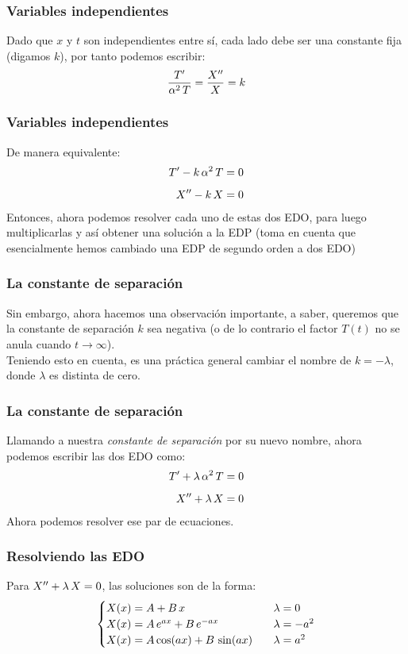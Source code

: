 \documentclass[12pt]{beamer}
\begin{document}
\begin{frame}
\frametitle{Variables independientes}
Dado que $x$ y $t$ son independientes entre sí, cada lado debe ser una constante fija (digamos $k$),  por tanto podemos escribir:
\pause
\begin{align*}
\dfrac{{T}^{\prime}}{\alpha^{2} \, T} = \dfrac{{X}^{\prime \prime}}{X} = k
\end{align*}
\end{frame}
\begin{frame}
\frametitle{Variables independientes}
De manera equivalente:
\pause
\begin{align*}
{T}^{\prime} - k \, \alpha^{2} \, T &= 0 \\[0.5em]
{X}^{\prime \prime} - k \, X &= 0
\end{align*}
\pause
Entonces, ahora podemos resolver cada uno de estas dos EDO, para luego multiplicarlas y así obtener una solución a la EDP (toma en cuenta que esencialmente hemos cambiado una EDP de segundo orden a dos EDO)
\end{frame}
\begin{frame}
\frametitle{La constante de separación}
Sin embargo, ahora hacemos una observación importante, a saber, queremos que la constante de separación $k$ sea negativa (o de lo contrario el factor $T (t)$ no se anula cuando $t \to \infty$).
\\
\bigskip
\pause
Teniendo esto en cuenta, es una práctica general cambiar el nombre de $k = - \lambda$, donde $\lambda$ es distinta de cero. 
\end{frame}
\begin{frame}
\frametitle{La constante de separación}
Llamando a nuestra \emph{constante de separación} por su nuevo nombre, ahora podemos escribir las dos EDO como:
\begin{align*}
{T}^{\prime} + \lambda \, \alpha^{2} \, T &= 0 \\[0.5em]
{X}^{\prime \prime} + \lambda \, X &= 0
\end{align*}
\pause
Ahora podemos resolver ese par de ecuaciones.
\end{frame}
\begin{frame}
\frametitle{Resolviendo las EDO}
Para ${X}^{\prime \prime} + \lambda \, X = 0$, las soluciones son de la forma:
\pause
\begin{align}
\begin{cases}
X(x) = A + B \, x & \hspace{0.2cm} \lambda = 0 \\
X(x) = A \, e^{a x} + B \, e^{-a x} & \hspace{0.2cm} \lambda = - a^{2} \\
X(x) = A \cos (a x ) + B \, \sin (a x) & \hspace{0.2cm} \lambda = a^{2}
\end{cases}
\label{eq:ecuacion_06_02_31}
\end{align}
\end{frame}
\end{document}
